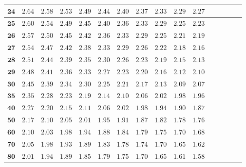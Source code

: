 \begin{customTableWrapper}{1.4}
\begin{longtable}{|r|r|r|r|r|r|r|r|r|r|r|r|r|r|r|r|}
    ${\mathbf{24}}$  & ${2.64}$   & ${2.58}$   & ${2.53}$   & ${2.49}$   & ${2.44}$   & ${2.40}$   & ${2.37}$   & ${2.33}$   & ${2.29}$   & ${2.27}$   \\  \hline 
    ${\mathbf{25}}$  & ${2.60}$   & ${2.54}$   & ${2.49}$   & ${2.45}$   & ${2.40}$   & ${2.36}$   & ${2.33}$   & ${2.29}$   & ${2.25}$   & ${2.23}$   \\  \hline 
    ${\mathbf{26}}$  & ${2.57}$   & ${2.50}$   & ${2.45}$   & ${2.42}$   & ${2.36}$   & ${2.33}$   & ${2.29}$   & ${2.25}$   & ${2.21}$   & ${2.19}$   \\  \hline 
    ${\mathbf{27}}$  & ${2.54}$   & ${2.47}$   & ${2.42}$   & ${2.38}$   & ${2.33}$   & ${2.29}$   & ${2.26}$   & ${2.22}$   & ${2.18}$   & ${2.16}$   \\  \hline 
    ${\mathbf{28}}$  & ${2.51}$   & ${2.44}$   & ${2.39}$   & ${2.35}$   & ${2.30}$   & ${2.26}$   & ${2.23}$   & ${2.19}$   & ${2.15}$   & ${2.13}$   \\  \hline 
    ${\mathbf{29}}$  & ${2.48}$   & ${2.41}$   & ${2.36}$   & ${2.33}$   & ${2.27}$   & ${2.23}$   & ${2.20}$   & ${2.16}$   & ${2.12}$   & ${2.10}$   \\  \hline 
    ${\mathbf{30}}$  & ${2.45}$   & ${2.39}$   & ${2.34}$   & ${2.30}$   & ${2.25}$   & ${2.21}$   & ${2.17}$   & ${2.13}$   & ${2.09}$   & ${2.07}$   \\  \hline 
    ${\mathbf{35}}$  & ${2.35}$   & ${2.28}$   & ${2.23}$   & ${2.19}$   & ${2.14}$   & ${2.10}$   & ${2.06}$   & ${2.02}$   & ${1.98}$   & ${1.96}$   \\  \hline 
    ${\mathbf{40}}$  & ${2.27}$   & ${2.20}$   & ${2.15}$   & ${2.11}$   & ${2.06}$   & ${2.02}$   & ${1.98}$   & ${1.94}$   & ${1.90}$   & ${1.87}$   \\  \hline 
    ${\mathbf{50}}$  & ${2.17}$   & ${2.10}$   & ${2.05}$   & ${2.01}$   & ${1.95}$   & ${1.91}$   & ${1.87}$   & ${1.82}$   & ${1.78}$   & ${1.76}$   \\  \hline 
    ${\mathbf{60}}$  & ${2.10}$   & ${2.03}$   & ${1.98}$   & ${1.94}$   & ${1.88}$   & ${1.84}$   & ${1.79}$   & ${1.75}$   & ${1.70}$   & ${1.68}$   \\  \hline 
    ${\mathbf{70}}$  & ${2.05}$   & ${1.98}$   & ${1.93}$   & ${1.89}$   & ${1.83}$   & ${1.78}$   & ${1.74}$   & ${1.70}$   & ${1.65}$   & ${1.62}$   \\  \hline 
    ${\mathbf{80}}$  & ${2.01}$   & ${1.94}$   & ${1.89}$   & ${1.85}$   & ${1.79}$   & ${1.75}$   & ${1.70}$   & ${1.65}$   & ${1.61}$   & ${1.58}$   \\  \hline 

\end{longtable}
\end{customTableWrapper}
